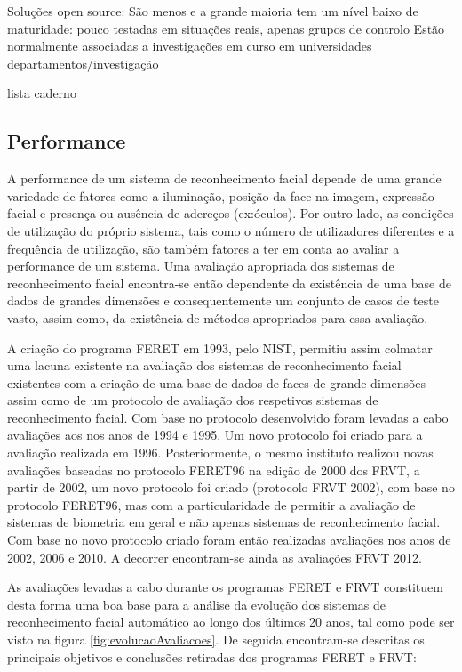 Soluções open source:
São menos e a grande maioria tem um nível baixo de maturidade:
pouco testadas em situações reais, apenas grupos de controlo
Estão normalmente associadas a investigações em curso em universidades departamentos/investigação

lista caderno

\subsection{Performance}\label{sec:performance}
A performance de um sistema de reconhecimento facial depende de uma grande variedade de fatores como a iluminação, posição da face na imagem, expressão facial e presença ou ausência de adereços (ex:óculos). Por outro lado, as condições de utilização do próprio sistema, tais como o número de utilizadores diferentes e a frequência de utilização, são também fatores a ter em conta ao avaliar a performance de um sistema. Uma avaliação apropriada dos sistemas de reconhecimento facial encontra-se então dependente da existência de uma base de dados de grandes dimensões e consequentemente um conjunto de casos de teste vasto, assim como, da existência de métodos apropriados para essa avaliação.

A criação do programa FERET em 1993, pelo NIST, permitiu assim colmatar uma lacuna existente na avaliação dos sistemas de reconhecimento facial existentes com a criação de uma base de dados de faces de grande dimensões assim como de um protocolo de avaliação dos respetivos sistemas de reconhecimento facial. Com base no protocolo desenvolvido foram levadas a cabo avaliações aos nos anos de 1994 e 1995. Um novo protocolo foi criado para a avaliação realizada em 1996. Posteriormente, o mesmo instituto realizou novas avaliações baseadas no protocolo FERET96 na edição de 2000 dos FRVT, a partir de 2002, um novo protocolo foi criado (protocolo FRVT 2002), com base no protocolo FERET96, mas com a particularidade de permitir a avaliação de sistemas de biometria em geral e não apenas sistemas de reconhecimento facial. Com base no novo protocolo criado foram então realizadas avaliações nos anos de 2002, 2006 e 2010. A decorrer encontram-se ainda as avaliações FRVT 2012. 

As avaliações levadas a cabo durante os programas FERET e FRVT constituem desta forma uma boa base para a análise da evolução dos sistemas de reconhecimento facial automático ao longo dos últimos 20 anos, tal como pode ser visto na figura \ref{fig:evolucaoAvaliacoes}. De seguida encontram-se descritas os principais objetivos e conclusões retiradas dos programas FERET e FRVT:

